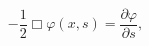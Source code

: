 \begin{equation}
   -\frac{1}{2} \Box \varphi (x, s) =  \frac{\partial \varphi}{\partial s},
   \label{6}
   \end{equation}

